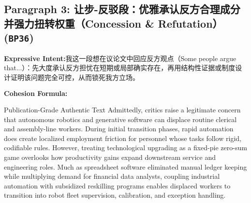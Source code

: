 \subsection*{Paragraph 3: 让步-反驳段：优雅承认反方合理成分并强力扭转权重（Concession \& Refutation） (\texttt{BP36})}
\noindent\textbf{Expressive Intent:}\enspace 我这一段想在议论文中回应反方观点（Some people argue that...）：先大度承认反方担忧在短期或局部确实存在，再用结构性证据或制度设计证明该问题完全可控，从而锁死我方立场。\par
\noindent\textbf{Cohesion Formula:}\par\vspace{4pt}
\begin{ExampleBox}{Publication-Grade Authentic Text}
Admittedly, critics raise a legitimate concern that autonomous robotics and generative software can displace routine clerical and assembly-line workers. During initial transition phases, rapid automation does create localized employment friction for personnel whose tasks follow rigid, codifiable rules. However, treating technological upgrading as a fixed-pie zero-sum game overlooks how productivity gains expand downstream service and engineering roles. Much as spreadsheet software eliminated manual ledger keeping while multiplying demand for financial data analysts, coupling industrial automation with subsidized reskilling programs enables displaced workers to transition into robot fleet supervision, calibration, and exception handling.
\end{ExampleBox}
